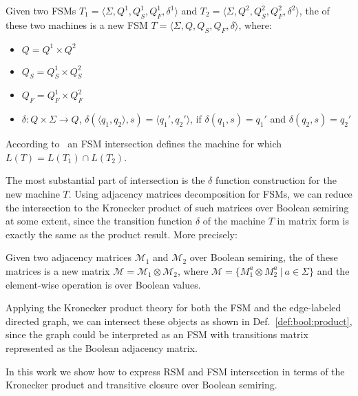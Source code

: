 \begin{definition}
\label{def:fsm:intersection}
Given two FSMs $T_1 = \langle \Sigma, Q^1, Q_S^1, Q_F^1, \delta^1 \rangle$ 
and $T_2 = \langle \Sigma, Q^2, Q_S^2, Q_F^2, \delta^2 \rangle$, the  of these two machines is a new FSM $T = \langle \Sigma, Q, Q_S, Q_F, \delta \rangle$, where:
\begin{itemize}
    \item $Q = Q^1 \times Q^2$
    \item $Q_S = Q_S^1 \times Q_S^2$
    \item $Q_F = Q_F^1 \times Q_F^2$
    \item $\delta: Q \times \Sigma \to Q$, 
    $\delta (\langle q_1, q_2 \rangle, s) = \langle q_1', q_2' \rangle$, 
    \newline if $\delta(q_1,s)=q_1'$ and $\delta(q_2,s)=q_2'$
\end{itemize}
\end{definition}

According to~\cite{automata:theory:10.5555/1177300} an FSM intersection defines the machine for which $L(T) = L(T_1) \cap L(T_2)$.

The most substantial part of intersection is the $\delta$ function construction for the new machine $T$.
Using adjacency matrices decomposition for FSMs, we can reduce the intersection to the Kronecker product of such matrices over Boolean semiring at some extent, since the transition function $\delta$ of the machine $T$ in matrix form is exactly the same as the product result.
More precisely:

\begin{definition}
\label{def:bool:product}
Given two adjacency matrices $\mathcal{M}_1$ and $\mathcal{M}_2$ over Boolean semiring, the  of these matrices is a new matrix
$\mathcal{M} = \mathcal{M}_1 \otimes \mathcal{M}_2$, where $\mathcal{M} = \{ M_1^a \otimes M_2^a~|~a \in \Sigma \}$ and the element-wise operation is  over Boolean values.
\end{definition}

Applying the Kronecker product theory for both the FSM and the edge-labeled directed graph, we can intersect these objects as shown in Def.~\ref{def:bool:product}, since the graph could be interpreted as an FSM with transitions matrix represented as the Boolean adjacency matrix.

In this work we show how to express RSM and FSM intersection in terms of 
the Kronecker product and transitive closure over Boolean semiring.